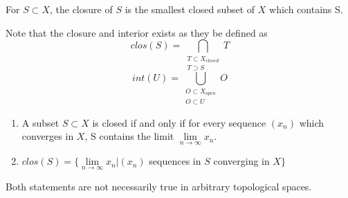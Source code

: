 \begin{mydef}
For $S \subset X$, the closure of $S$ is the smallest closed subset of $X$ which contains S. \par 
\end{mydef}
Note that the closure and interior exists as they be defined as 
\[ clos(S) = \bigcap_{\substack{T\subset X_{closed} \\ T \supset S}} T \]
\[ int(U) = \bigcup_{\substack{O\subset X_{open} \\ O \subset U}} O \]
\begin{thrm}
\begin{enumerate}
\item A subset $S\subset X$ is closed if and only if for every sequence $(x_n)$ which converges in $X$, S contains the limit $\lim\limits_{n\to\infty} x_n$.
\item $clos(S)=\{ \lim\limits_{n\to\infty} x_n | (x_n)$ sequences in $S$ converging in $X\}$
\end{enumerate}
\end{thrm}
 Both statements are not necessarily true in arbitrary topological spaces.
